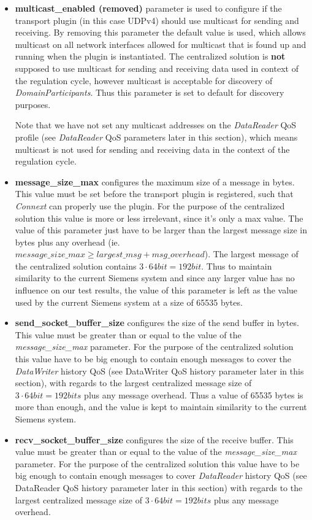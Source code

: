 \begin{itemize}
	\item \textbf{multicast\_enabled (removed)} parameter is used to configure if the transport plugin (in this case UDPv4) should use multicast for sending and receiving. By removing this parameter the default value is used, which allows multicast on all network interfaces allowed for multicast that is found up and running when the plugin is instantiated. The centralized solution is \textbf{not} supposed to use multicast for sending and receiving data used in context of the regulation cycle, however multicast is acceptable for discovery of \textit{DomainParticipants}. Thus this parameter is set to default for discovery purposes.
	
	Note that we have not set any multicast addresses on the \textit{DataReader} QoS profile (see \textit{DataReader} QoS parameters later in this section), which means multicast is not used for sending and receiving data in the context of the regulation cycle.
	
	\item \textbf{message\_size\_max} configures the maximum size of a message in bytes. This value must be set before the transport plugin is registered, such that \textit{Connext} can properly use the plugin. For the purpose of the centralized solution this value is more or less irrelevant, since it's only a max value. The value of this parameter just have to be larger than the largest message size in bytes plus any overhead (ie. $message\_size\_max \geq largest\_msg + msg\_overhead$). The largest message of the centralized solution contains $3\cdot64bit=192bit$. Thus to maintain similarity to the current Siemens system and since any larger value has no influence on our test results, the value of this parameter is left as the value used by the current Siemens system at a size of 65535 bytes.
	
	\item \textbf{send\_socket\_buffer\_size} configures the size of the send buffer in bytes. This value must be greater than or equal to the value of the \textit{message\_size\_max} parameter. For the purpose of the centralized solution this value have to be big enough to contain enough messages to cover the \textit{DataWriter} history QoS (see DataWriter QoS history parameter later in this section), with regards to the largest centralized message size of $3\cdot64bit=192bits$ plus any message overhead. Thus a value of 65535 bytes is more than enough, and the value is kept to maintain similarity to the current Siemens system.
	
	\item \textbf{recv\_socket\_buffer\_size} configures the size of the receive buffer. This value must be greater than or equal to the value of the \textit{message\_size\_max} parameter. For the purpose of the centralized solution this value have to be big enough to contain enough messages to cover \textit{DataReader} history QoS (see DataReader QoS history parameter later in this section) with regards to the largest centralized message size of $3\cdot64bit=192bits$ plus any message overhead. 
\end{itemize}

